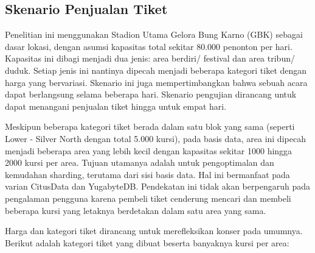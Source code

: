 \subsection{Skenario Penjualan Tiket}

Penelitian ini menggunakan Stadion Utama Gelora Bung Karno (GBK) sebagai dasar lokasi, dengan asumsi kapasitas total sekitar 80.000 penonton per hari. Kapasitas ini dibagi menjadi dua jenis: area berdiri/ festival dan area tribun/ duduk. Setiap jenis ini nantinya dipecah menjadi beberapa kategori tiket dengan harga yang bervariasi. Skenario ini juga mempertimbangkan bahwa sebuah acara dapat berlangsung selama beberapa hari. Skenario pengujian dirancang untuk dapat menangani penjualan tiket hingga untuk empat hari.

Meskipun beberapa kategori tiket berada dalam satu blok yang sama (seperti Lower - Silver North dengan total 5.000 kursi), pada basis data, area ini dipecah menjadi beberapa area yang lebih kecil dengan kapasitas sekitar 1000 hingga 2000 kursi per area. Tujuan utamanya adalah untuk pengoptimalan dan kemudahan sharding, terutama dari sisi basis data. Hal ini bermanfaat pada varian CitusData dan YugabyteDB. Pendekatan ini tidak akan berpengaruh pada pengalaman pengguna karena pembeli tiket cenderung mencari dan membeli beberapa kursi yang letaknya berdetakan dalam satu area yang sama.

Harga dan kategori tiket dirancang untuk merefleksikan konser pada umumnya. Berikut adalah kategori tiket yang dibuat beserta banyaknya kursi per area:

